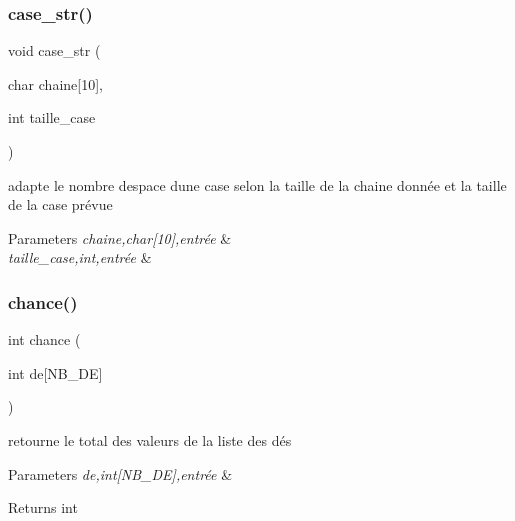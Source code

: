 \subsubsection{\texorpdfstring{case\+\_\+str()}{case\_str()}}
{\footnotesize\ttfamily void case\+\_\+str (\begin{DoxyParamCaption}\item[{char}]{chaine\mbox{[}10\mbox{]},  }\item[{int}]{taille\+\_\+case }\end{DoxyParamCaption})}



adapte le nombre d\textquotesingle{}espace d\textquotesingle{}une case selon la taille de la chaine donnée et la taille de la case prévue 


\begin{DoxyParams}{Parameters}
{\em chaine,char\mbox{[}10\mbox{]},entrée} & \\
\hline
{\em taille\+\_\+case,int,entrée} & \\
\hline
\end{DoxyParams}
\mbox{\label{yams___cleo___martin-_colleu__2_80_8c_ab6c13f2b7be7ec56df645329e87c6929}} 
\subsubsection{\texorpdfstring{chance()}{chance()}}
{\footnotesize\ttfamily int chance (\begin{DoxyParamCaption}\item[{int}]{de\mbox{[}\+N\+B\+\_\+\+D\+E\mbox{]} }\end{DoxyParamCaption})}



retourne le total des valeurs de la liste des dés 


\begin{DoxyParams}{Parameters}
{\em de,int\mbox{[}\+N\+B\+\_\+\+D\+E\mbox{]},entrée} & \\
\hline
\end{DoxyParams}
\begin{DoxyReturn}{Returns}
int 
\end{DoxyReturn}
\mbox{\label{yams___cleo___martin-_colleu__2_80_8c_acdf5442484ebac64baffd975bb117bf8}} 

